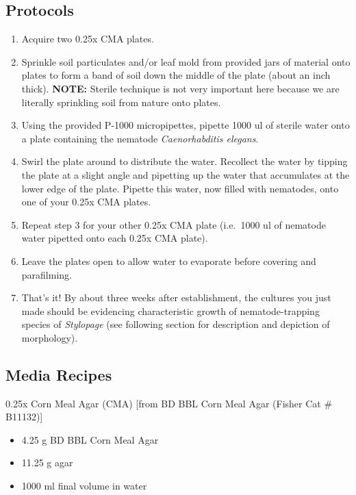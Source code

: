 \documentclass[]{book}
\providecommand{\tightlist}{%
  \setlength{\itemsep}{0pt}\setlength{\parskip}{0pt}}
\begin{document}
\hypertarget{protocols}{%
\subsection{Protocols}\label{protocols}}

\begin{enumerate}
\def\labelenumi{\arabic{enumi}.}
\tightlist
\item
  Acquire two 0.25x CMA plates.
\item
  Sprinkle soil particulates and/or leaf mold from provided jars of material onto plates to form a band of soil down the middle of the plate (about an inch thick). \textbf{NOTE:} Sterile technique is not very important here because we are literally sprinkling soil from nature onto plates.
\item
  Using the provided P-1000 micropipettes, pipette 1000 ul of sterile water onto a plate containing the nematode \emph{Caenorhabditis elegans}.
\item
  Swirl the plate around to distribute the water. Recollect the water by tipping the plate at a slight angle and pipetting up the water that accumulates at the lower edge of the plate. Pipette this water, now filled with nematodes, onto one of your 0.25x CMA plates.
\item
  Repeat step 3 for your other 0.25x CMA plate (i.e.~1000 ul of nematode water pipetted onto each 0.25x CMA plate).
\item
  Leave the plates open to allow water to evaporate before covering and parafilming.
\item
  That's it! By about three weeks after establishment, the cultures you just made should be evidencing characteristic growth of nematode-trapping species of \emph{Stylopage }(see following section for description and depiction of morphology).
\end{enumerate}

\hypertarget{media-recipes}{%
\subsection{Media Recipes}\label{media-recipes}}

{0.25x Corn Meal Agar (CMA) {[}from BD BBL Corn Meal Agar (Fisher Cat \# B11132){]}}

\begin{itemize}
\tightlist
\item
  4.25 g BD BBL Corn Meal Agar
\item
  11.25 g agar
\item
  1000 ml final volume in water
\end{itemize}
\end{document}
